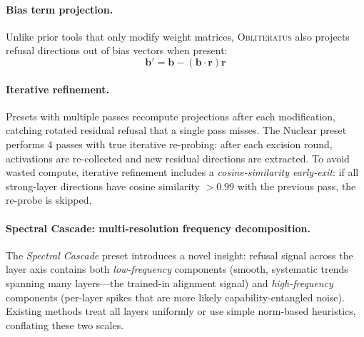 \documentclass[11pt]{article}
\begin{document}
\paragraph{Bias term projection.}
Unlike prior tools that only modify weight matrices, \textsc{Obliteratus} also projects refusal directions out of bias vectors when present:
\begin{equation}
    \mathbf{b}' = \mathbf{b} - (\mathbf{b} \cdot \mathbf{r})\mathbf{r}
\end{equation}

\paragraph{Iterative refinement.}
Presets with multiple passes recompute projections after each modification, catching rotated residual refusal that a single pass misses. The Nuclear preset performs 4 passes with true iterative re-probing: after each excision round, activations are re-collected and new residual directions are extracted. To avoid wasted compute, iterative refinement includes a \emph{cosine-similarity early-exit}: if all strong-layer directions have cosine similarity $> 0.99$ with the previous pass, the re-probe is skipped.

\paragraph{Spectral Cascade: multi-resolution frequency decomposition.}
\label{para:spectral_cascade}
The \emph{Spectral Cascade} preset introduces a novel insight: refusal signal across the layer axis contains both \emph{low-frequency} components (smooth, systematic trends spanning many layers---the trained-in alignment signal) and \emph{high-frequency} components (per-layer spikes that are more likely capability-entangled noise). Existing methods treat all layers uniformly or use simple norm-based heuristics, conflating these two scales.
\end{document}
